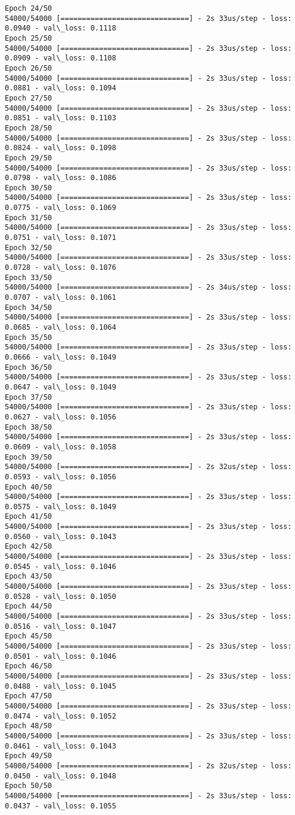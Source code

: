 \documentclass[11pt]{article}
\begin{document}
\begin{Verbatim}[commandchars=\\\{\}]
Epoch 24/50
54000/54000 [==============================] - 2s 33us/step - loss: 0.0940 - val\_loss: 0.1118
Epoch 25/50
54000/54000 [==============================] - 2s 33us/step - loss: 0.0909 - val\_loss: 0.1108
Epoch 26/50
54000/54000 [==============================] - 2s 33us/step - loss: 0.0881 - val\_loss: 0.1094
Epoch 27/50
54000/54000 [==============================] - 2s 33us/step - loss: 0.0851 - val\_loss: 0.1103
Epoch 28/50
54000/54000 [==============================] - 2s 33us/step - loss: 0.0824 - val\_loss: 0.1098
Epoch 29/50
54000/54000 [==============================] - 2s 33us/step - loss: 0.0798 - val\_loss: 0.1086
Epoch 30/50
54000/54000 [==============================] - 2s 33us/step - loss: 0.0775 - val\_loss: 0.1069
Epoch 31/50
54000/54000 [==============================] - 2s 33us/step - loss: 0.0751 - val\_loss: 0.1071
Epoch 32/50
54000/54000 [==============================] - 2s 33us/step - loss: 0.0728 - val\_loss: 0.1076
Epoch 33/50
54000/54000 [==============================] - 2s 34us/step - loss: 0.0707 - val\_loss: 0.1061
Epoch 34/50
54000/54000 [==============================] - 2s 33us/step - loss: 0.0685 - val\_loss: 0.1064
Epoch 35/50
54000/54000 [==============================] - 2s 33us/step - loss: 0.0666 - val\_loss: 0.1049
Epoch 36/50
54000/54000 [==============================] - 2s 33us/step - loss: 0.0647 - val\_loss: 0.1049
Epoch 37/50
54000/54000 [==============================] - 2s 33us/step - loss: 0.0627 - val\_loss: 0.1056
Epoch 38/50
54000/54000 [==============================] - 2s 33us/step - loss: 0.0609 - val\_loss: 0.1058
Epoch 39/50
54000/54000 [==============================] - 2s 32us/step - loss: 0.0593 - val\_loss: 0.1056
Epoch 40/50
54000/54000 [==============================] - 2s 33us/step - loss: 0.0575 - val\_loss: 0.1049
Epoch 41/50
54000/54000 [==============================] - 2s 33us/step - loss: 0.0560 - val\_loss: 0.1043
Epoch 42/50
54000/54000 [==============================] - 2s 33us/step - loss: 0.0545 - val\_loss: 0.1046
Epoch 43/50
54000/54000 [==============================] - 2s 33us/step - loss: 0.0528 - val\_loss: 0.1050
Epoch 44/50
54000/54000 [==============================] - 2s 33us/step - loss: 0.0516 - val\_loss: 0.1047
Epoch 45/50
54000/54000 [==============================] - 2s 33us/step - loss: 0.0501 - val\_loss: 0.1046
Epoch 46/50
54000/54000 [==============================] - 2s 33us/step - loss: 0.0488 - val\_loss: 0.1045
Epoch 47/50
54000/54000 [==============================] - 2s 33us/step - loss: 0.0474 - val\_loss: 0.1052
Epoch 48/50
54000/54000 [==============================] - 2s 33us/step - loss: 0.0461 - val\_loss: 0.1043
Epoch 49/50
54000/54000 [==============================] - 2s 32us/step - loss: 0.0450 - val\_loss: 0.1048
Epoch 50/50
54000/54000 [==============================] - 2s 33us/step - loss: 0.0437 - val\_loss: 0.1055

    \end{Verbatim}
\end{document}
